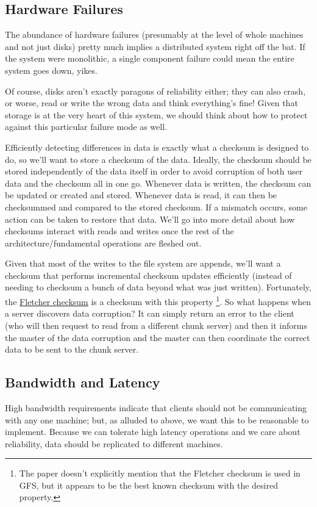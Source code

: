 \documentclass[11pt]{article}
\begin{document}
\subsection*{Hardware Failures}
\label{sec:orgbd0e523}
The abundance of hardware failures (presumably at the level of whole machines and not just disks) pretty much implies a distributed system right off the bat.
If the system were monolithic, a single component failure could mean the entire system goes down, yikes.

Of course, disks aren't exactly paragons of reliability either; they can also crash, or worse, read or write the wrong data and think everything's fine! Given that storage
is at the very heart of this system, we should think about how to protect against this particular failure mode as well.

Efficiently detecting differences in data is exactly what a checksum is designed to do, so we'll want to store a checksum of the data. Ideally, the checksum should
be stored independently of the data itself in order to avoid corruption of both user data and the checksum all in one go. Whenever data is written, the checksum can be updated or created and stored.
Whenever data is read, it can then be checksummed and compared to the stored checksum. If a mismatch occurs, some action can be taken to restore that data.
We'll go into more detail about how checksums interact with reads and writes once the rest of the architecture/fundamental operations are fleshed out.

Given that most of the writes to the file system are appends, we'll want a checksum that performs incremental checksum updates efficiently (instead of needing to checksum
a bunch of data beyond what was just written). Fortunately, the \href{https://en.wikipedia.org/wiki/Fletcher\%2527s\_checksum}{Fletcher checksum} is a checksum with this property \footnote{The paper doesn't explicitly mention that the Fletcher checksum is used in GFS, but it appears to be the best known checksum with the desired property.}. So what happens when a server discovers data corruption?
It can simply return an error to the client (who will then request to read from a different chunk server) and then it informs the master of the data corruption and the master can then
coordinate the correct data to be sent to the chunk server.

\subsection*{Bandwidth and Latency}
\label{sec:orgd1cc5a5}
High bandwidth requirements indicate that clients should not be communicating with any one machine; but, as alluded to above, we want this to be
reasonable to implement. Because we can tolerate high latency operations and we care about reliability, data should be replicated to different machines.
\end{document}
